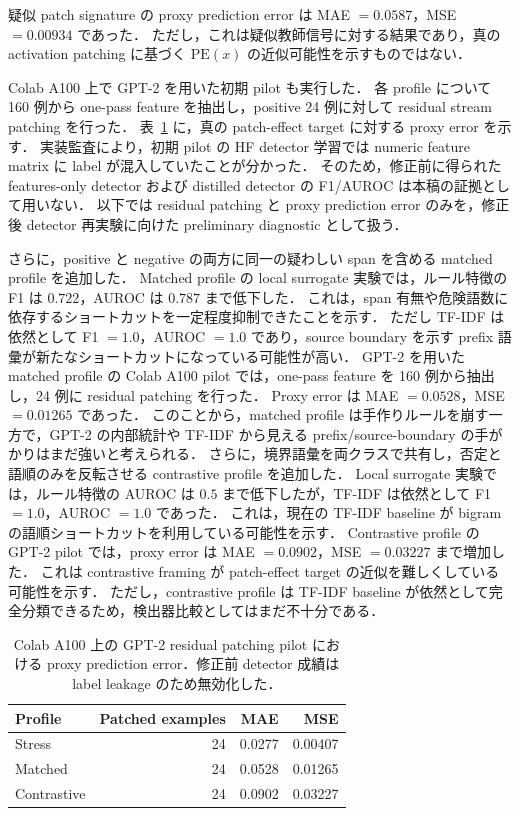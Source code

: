 \documentclass[11pt,a4paper]{ltjsarticle}
\begin{document}
疑似 patch signature の proxy prediction error は MAE $=0.0587$，MSE $=0.00934$ であった．
ただし，これは疑似教師信号に対する結果であり，真の activation patching に基づく $\mathrm{PE}(x)$ の近似可能性を示すものではない．

Colab A100 上で GPT-2 を用いた初期 pilot も実行した．
各 profile について 160 例から one-pass feature を抽出し，positive 24 例に対して residual stream patching を行った．
表~\ref{tab:gpt2-pilots} に，真の patch-effect target に対する proxy error を示す．
実装監査により，初期 pilot の HF detector 学習では numeric feature matrix に label が混入していたことが分かった．
そのため，修正前に得られた features-only detector および distilled detector の F1/AUROC は本稿の証拠として用いない．
以下では residual patching と proxy prediction error のみを，修正後 detector 再実験に向けた preliminary diagnostic として扱う．

さらに，positive と negative の両方に同一の疑わしい span を含める matched profile を追加した．
Matched profile の local surrogate 実験では，ルール特徴の F1 は $0.722$，AUROC は $0.787$ まで低下した．
これは，span 有無や危険語数に依存するショートカットを一定程度抑制できたことを示す．
ただし TF-IDF は依然として F1 $=1.0$，AUROC $=1.0$ であり，source boundary を示す prefix 語彙が新たなショートカットになっている可能性が高い．
GPT-2 を用いた matched profile の Colab A100 pilot では，one-pass feature を 160 例から抽出し，24 例に residual patching を行った．
Proxy error は MAE $=0.0528$，MSE $=0.01265$ であった．
このことから，matched profile は手作りルールを崩す一方で，GPT-2 の内部統計や TF-IDF から見える prefix/source-boundary の手がかりはまだ強いと考えられる．
さらに，境界語彙を両クラスで共有し，否定と語順のみを反転させる contrastive profile を追加した．
Local surrogate 実験では，ルール特徴の AUROC は $0.5$ まで低下したが，TF-IDF は依然として F1 $=1.0$，AUROC $=1.0$ であった．
これは，現在の TF-IDF baseline が bigram の語順ショートカットを利用している可能性を示す．
Contrastive profile の GPT-2 pilot では，proxy error は MAE $=0.0902$，MSE $=0.03227$ まで増加した．
これは contrastive framing が patch-effect target の近似を難しくしている可能性を示す．
ただし，contrastive profile は TF-IDF baseline が依然として完全分類できるため，検出器比較としてはまだ不十分である．

\begin{table}[t]
\centering
\caption{Colab A100 上の GPT-2 residual patching pilot における proxy prediction error．修正前 detector 成績は label leakage のため無効化した．}
\label{tab:gpt2-pilots}
\begin{tabular}{lrrr}
\toprule
Profile & Patched examples & MAE & MSE \\
\midrule
Stress & 24 & 0.0277 & 0.00407 \\
Matched & 24 & 0.0528 & 0.01265 \\
Contrastive & 24 & 0.0902 & 0.03227 \\
\bottomrule
\end{tabular}
\end{table}
\end{document}
